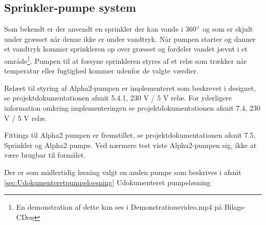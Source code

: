 \subsection{Sprinkler-pumpe system}
Som bekendt er der anvendt en sprinkler der kan vande i 360$^{\circ}$ og som er skjult under græsset når denne ikke er under vandtryk. Når pumpen starter og danner et vandtryk kommer sprinkleren op over græsset og fordeler vandet jævnt i et område\footnote{En demonstration af dette kan ses i Demonstrationsvideo.mp4 på Bilags-CDen}.
Pumpen til at forsyne sprinkleren styres af et relæ som trækker når temperatur eller fugtighed kommer udenfor de valgte værdier.

Relæet til styring af Alpha2-pumpen er implementeret som beskrevet i designet, se projektdokumentationen afsnit 5.4.1, 230 V / 5 V relæ. For yderligere information omkring implementeringen se projektdokumentationen afsnit 7.4, 230 V / 5 V relæ. 

Fittings til Alpha2 pumpen er fremstillet, se projektdokumentationen afsnit 7.5, Sprinkler og Alpha2 pumpe. Ved nærmere test viste Alpha2-pumpen sig, ikke at være brugbar til formålet.  

Der er som midlertidig løsning valgt en anden pumpe som beskrives i afsnit \ref{sec:Udokumenteretpumpeloesning} Udokumenteret pumpeløsning